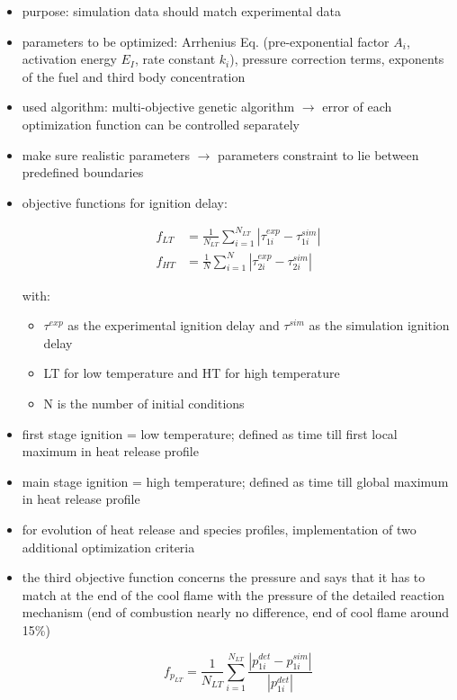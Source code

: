 \documentclass[12pt,oneside,a4paper,english]{article}
\begin{document}
\begin{itemize}
\item{purpose: simulation data should match experimental data}
\item{parameters to be optimized: Arrhenius Eq. (pre-exponential factor $A_i$, activation energy $E_I$, rate constant $k_i$), pressure correction terms, exponents of the fuel and third body concentration}
\item{used algorithm: multi-objective genetic algorithm $\rightarrow$ error of each optimization function can be controlled separately}
\item{make sure realistic parameters $\rightarrow$ parameters constraint to lie between predefined boundaries}
\item{objective functions for ignition delay:

\begin{align}
f_{LT} &= \frac{1}{N_{LT}} \sum_{i=1}^{N_{LT}} |\tau_{1i}^{exp}-\tau_{1i}^{sim}| \\
f_{HT} &= \frac{1}{N} \sum_{i=1}^{N} |\tau_{2i}^{exp}-\tau_{2i}^{sim}|
\end{align}

with:}

	\begin{itemize}
	\item{$\tau^{exp}$ as the experimental ignition delay and $\tau^{sim}$ as the simulation ignition delay}
	\item{LT for low temperature and HT for high temperature}
	\item{N is the number of initial conditions}
	\end{itemize}

\item{first stage ignition = low temperature; defined as time till first local maximum in heat release profile}
\item{main stage ignition = high temperature; defined as time till global maximum in heat release profile}
\item{for evolution of heat release and species profiles, implementation of two additional optimization criteria}
\item{the third objective function concerns the pressure and says that it has to match at the end of the cool flame with the pressure of the detailed reaction mechanism (end of combustion nearly no difference, end of cool flame around 15\%)}

\begin{equation}
f_{p_{LT}} = \frac{1}{N_{LT}} \sum_{i=1}^{N_{LT}} \frac{|p_{1i}^{det}-p_{1i}^{sim}|}{|p_{1i}^{det}|}
\end{equation}


\end{itemize}
\end{document}
